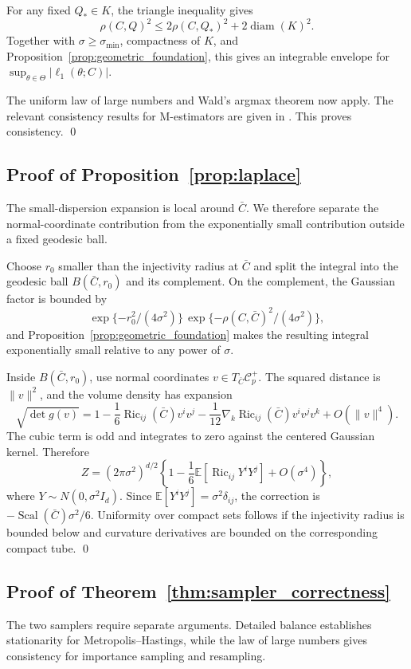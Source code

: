 \documentclass[
  12pt]{article}
\newcommand{\Corr}{\mathcal C^+}
\newcommand{\Scal}{\operatorname{Scal}}
\newcommand{\Ric}{\operatorname{Ric}}
\newcommand{\E}{\mathbb E}
\begin{document}
For any fixed $Q_*\in K$, the triangle inequality gives
\[
\rho(C,Q)^2\le 2\rho(C,Q_*)^2+2\operatorname{diam}(K)^2.
\]
Together with $\sigma\ge\sigma_{\min}$, compactness of $K$, and Proposition~\ref{prop:geometric_foundation}, this gives an integrable envelope for $\sup_{\theta\in\Theta}|\ell_1(\theta;C)|$.

The uniform law of large numbers and Wald's argmax theorem now apply. The relevant consistency results for M-estimators are given in  \citet[Chapter~5]{vandervaart_1998_AsymptoticStatistics}. This proves consistency. \qed

\subsection{Proof of Proposition~\ref{prop:laplace}}

The small-dispersion expansion is local around $\bar C$. We therefore separate the normal-coordinate contribution from the exponentially small contribution outside a fixed geodesic ball.

Choose $r_0$ smaller than the injectivity radius at $\bar C$ and split the integral into the geodesic ball $B(\bar C,r_0)$ and its complement. On the complement, the Gaussian factor is bounded by
\[
\exp\{-r_0^2/(4\sigma^2)\}\,\exp\{-\rho(C,\bar C)^2/(4\sigma^2)\},
\]
and Proposition~\ref{prop:geometric_foundation} makes the resulting integral exponentially small relative to any power of $\sigma$.

Inside $B(\bar C,r_0)$, use normal coordinates $v\in T_{\bar C}\Corr_p$. The squared distance is $\|v\|^2$, and the volume density has expansion
\[
\sqrt{\det g(v)}=1-\frac16\Ric_{ij}(\bar C)v^iv^j-\frac1{12}\nabla_k\Ric_{ij}(\bar C)v^iv^jv^k+O(\|v\|^4).
\]
The cubic term is odd and integrates to zero against the centered Gaussian kernel. Therefore
\[
Z=(2\pi\sigma^2)^{d/2}\left\{1-\frac16\E[\Ric_{ij}Y^iY^j]+O(\sigma^4)\right\},
\]
where $Y\sim N(0,\sigma^2I_d)$. Since $\E[Y^iY^j]=\sigma^2\delta_{ij}$, the correction is $-\Scal(\bar C)\sigma^2/6$. Uniformity over compact sets follows if the injectivity radius is bounded below and curvature derivatives are bounded on the corresponding compact tube. \qed

\subsection{Proof of Theorem~\ref{thm:sampler_correctness}}

The two samplers require separate arguments. Detailed balance establishes stationarity for Metropolis--Hastings, while the law of large numbers gives consistency for importance sampling and resampling.
\end{document}
